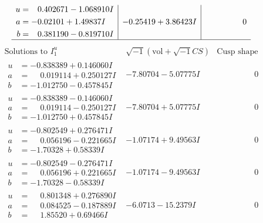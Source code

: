 \documentclass[1p]{elsarticle_modified}
\theoremstyle{definition}
\newcommand{\I}{\sqrt{-1}}
\begin{document}
$$\begin{array}{c|c|c}
\begin{aligned}
u &= \phantom{-}0.402671 - 1.068910 I \\
a &= -0.02101 + 1.49837 I \\
b &= \phantom{-}0.381190 - 0.819710 I\end{aligned}
 & -0.25419 + 3.86423 I & \phantom{-0.000000 } 0\\
 \hline 
 \end{array}$$\newpage$$\begin{array}{c|c|c}  
\text{Solutions to }I^u_{1}& \I (\text{vol} + \sqrt{-1}CS) & \text{Cusp shape}\\
 \hline 
\begin{aligned}
u &= -0.838389 + 0.146060 I \\
a &= \phantom{-}0.019114 + 0.250127 I \\
b &= -1.012750 - 0.457845 I\end{aligned}
 & -7.80704 - 5.07775 I & \phantom{-0.000000 } 0 \\ \hline\begin{aligned}
u &= -0.838389 - 0.146060 I \\
a &= \phantom{-}0.019114 - 0.250127 I \\
b &= -1.012750 + 0.457845 I\end{aligned}
 & -7.80704 + 5.07775 I & \phantom{-0.000000 } 0 \\ \hline\begin{aligned}
u &= -0.802549 + 0.276471 I \\
a &= \phantom{-}0.056196 - 0.221665 I \\
b &= -1.70328 + 0.58339 I\end{aligned}
 & -1.07174 + 9.49563 I & \phantom{-0.000000 } 0 \\ \hline\begin{aligned}
u &= -0.802549 - 0.276471 I \\
a &= \phantom{-}0.056196 + 0.221665 I \\
b &= -1.70328 - 0.58339 I\end{aligned}
 & -1.07174 - 9.49563 I & \phantom{-0.000000 } 0 \\ \hline\begin{aligned}
u &= \phantom{-}0.801348 + 0.276890 I \\
a &= \phantom{-}0.084525 - 0.187889 I \\
b &= \phantom{-}1.85520 + 0.69466 I\end{aligned}
 & -6.0713 - 15.2379 I & \phantom{-0.000000 } 0 \\ \hline\begin{aligned}

\end{aligned}
\end{array}$$
\end{document}
